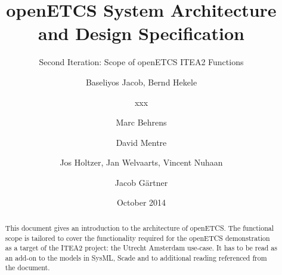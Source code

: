 \documentclass{template/openetcs_report}
\begin{document}
\frontmatter
{}


%




\title{openETCS System Architecture and Design Specification}

\subtitle{Second Iteration: Scope of openETCS ITEA2 Functions}

\date{October 2014}



\techassessoraffil{[affiliation]}





\author{Baseliyos Jacob, Bernd Hekele}


\author{xxx}


\author{Marc Behrens}

\author{David Mentre}

\author{Jos Holtzer, Jan Welvaarts, Vincent Nuhaan}

\author{Jacob G\"artner}




\begin{abstract}
This document gives an introduction to the architecture of openETCS. The functional scope is tailored to cover the functionality required for the openETCS demonstration as a target of the ITEA2 project: the Utrecht Amsterdam use-case. It has to be read as an add-on to the models in SysML, Scade and to additional reading referenced from the document.
\end{abstract}
\end{document}
